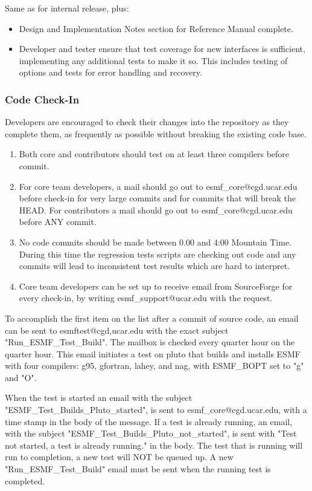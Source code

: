 Same as for internal release, plus:
\begin{itemize}
\item Design and Implementation Notes section for Reference Manual complete.
\item Developer and tester ensure that test coverage for new interfaces is sufficient, implementing any additional tests to make it so. This includes testing of options and tests for error handling and recovery.
\end{itemize}

\subsubsection{Code Check-In}

Developers are encouraged to check their changes into the repository
as they complete them, as frequently as possible without breaking the
existing code base.

\begin{enumerate}
\item Both core and contributors should test on at least three compilers before commit.
\item For core team developers, a mail should go out to esmf\_core@cgd.ucar.edu
before check-in for very large commits and for commits that will break the
HEAD. For contributors a mail should go out to esmf\_core@cgd.ucar.edu before
ANY commit.
\item No code commits should be made between 0.00 and 4:00 Mountain Time. During
this time the regression tests scripts are checking out code and any commits 
will lead to inconsistent test results which are hard to interpret.
\item Core team developers can be set up to receive email from SourceForge
for every check-in, by writing esmf\_support@ucar.edu with the request.
\end{enumerate}

To accomplish the first item on the list after a commit of source code, an email can be sent
to esmftest@cgd,ucar.edu with the exact subject "Run\_ESMF\_Test\_Build". The mailbox is checked
every quarter hour on the quarter hour. This email initiates a test on pluto that
builds and installs ESMF with four compilers: g95, gfortran, lahey, and nag, with
ESMF\_BOPT set to "g" and "O".

When the test is started an email with the subject "ESMF\_Test\_Builds\_Pluto\_started",
is sent to esmf\_core@cgd.ucar.edu, with a time stamp in the body of the message.
If a test is already running, an email, with the subject "ESMF\_Test\_Builds\_Pluto\_not\_started",
is sent with "Test not started, a test is already running." in the body.
The test that is running will run to completion, a new test will NOT be queued up. A new
"Run\_ESMF\_Test\_Build" email must be sent when the running test is completed.

